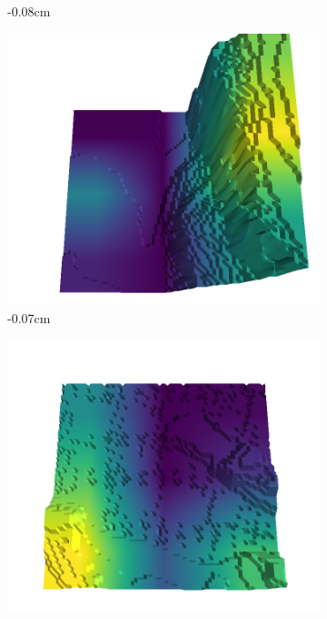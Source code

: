 \documentclass[../document.tex]{subfiles}
\begin{document}
\begin{figure}[H]
\begin{subfigure}[b]{0.242\linewidth}
    \caption{-0.08cm}
    \end{subfigure}
    \begin{subfigure}[b]{0.242\linewidth}
    \includegraphics[width=\linewidth]{../img/5/quarry/worst/00-patch-3d-majavi-colormap-20.png}
    \caption{-0.07cm}
    \end{subfigure}
    \begin{subfigure}[b]{0.242\linewidth}
    \includegraphics[width=\linewidth]{../img/5/quarry/worst/00-patch-3d-majavi-colormap-25.png}

\end{subfigure}
\end{figure}
\end{document}
